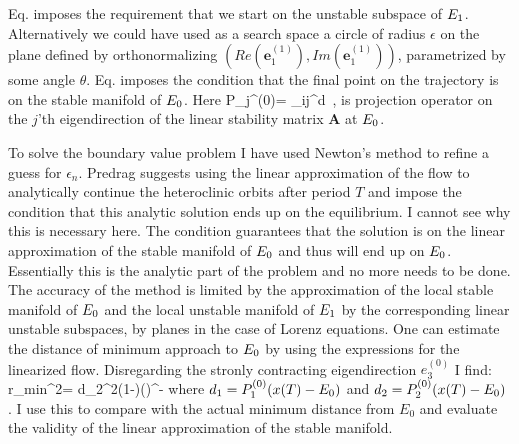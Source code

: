 \documentclass[letter,10pt]{article}
\begin{document}
Eq.  imposes the requirement that we start on the unstable subspace of $E_{1}$.
Alternatively we could have used as a search space a circle of radius $\epsilon$ on the plane defined
by orthonormalizing $\left(Re(\mathbf{e}_1^{(1)}),Im(\mathbf{e}_1^{(1)})\right)$, parametrized by some
angle $\theta$. Eq.  imposes the condition that the final point on the trajectory is
on the stable manifold of $E_{0}$. Here
\beq
	P_j^{(0)}= \prod_{i\neq j}^d \,,
\eeq
is projection operator on the $j$'th eigendirection of the linear stability matrix $\mathbf{A}$ at $E_{0}$.

To solve the boundary value problem I have used Newton's method to refine a guess for $\epsilon_n$. %
Predrag suggests using the linear approximation of the flow to analytically continue the heteroclinic
orbits after period $T$ and impose the condition that this analytic solution ends up on the equilibrium.
I cannot see why this is necessary here. The condition  guarantees that the solution
is on the linear approximation of the stable manifold of $E_{0}$ and thus will end up on $E_{0}$.
Essentially this is the analytic part of the problem and no more needs to be done. The accuracy of the
method is limited by the approximation of the local stable manifold of $E_{0}$ and the local unstable
manifold of $E_{1}$ by the corresponding linear unstable subspaces, \ie by planes in the case of Lorenz
equations. One can estimate the distance of minimum approach to $E_{0}$ by using the expressions for
the linearized flow. Disregarding the stronly contracting eigendirection $e_3^{(0)}$ I find:
\beq
	r_{min}^2= d_2^2\left(1-\right)\left(\-\right)^{-}
\eeq
where $d_1=P_1^{(0)} (x(T)-E_{0})$ and $d_2=P_2^{(0)} (x(T)-E_{0})$ . I use this to compare with the actual minimum distance from $E_0$ and
evaluate the validity of the linear approximation of the stable manifold.
\end{document}
